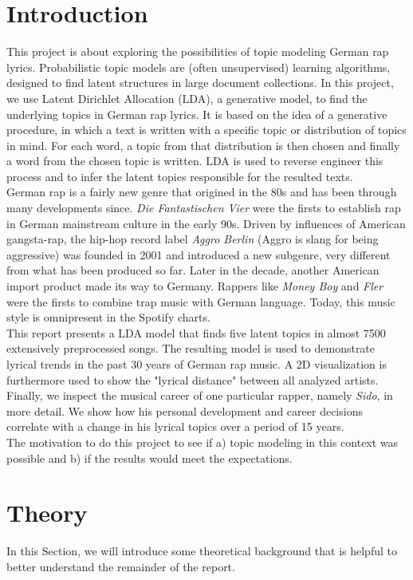 \documentclass[conference]{IEEEtran}
\begin{document}
\section{Introduction}
This project is about exploring the possibilities of topic modeling German rap lyrics. Probabilistic topic models are (often unsupervised) learning algorithms, designed to find latent structures in large document collections. In this project, we use Latent Dirichlet Allocation (LDA), a generative model, to find the underlying topics in German rap lyrics. It is based on the idea of a generative procedure, in which a text is written with a specific topic or distribution of topics in mind. For each word, a topic from that distribution is then chosen and finally a word from the chosen topic is written. LDA is used to reverse engineer this process and to infer the latent topics responsible for the resulted texts.\\
German rap is a fairly new genre that origined in the 80s and has been through many developments since. \textit{Die Fantastischen Vier} were the firsts to establish rap in German mainstream culture in the early 90s. Driven by influences of American gangsta-rap, the hip-hop record label \textit{Aggro Berlin} (Aggro is slang for being aggressive) was founded in 2001 and introduced a new subgenre, very different from what has been produced so far. Later in the decade, another American import product made its way to Germany. Rappers like \textit{Money Boy} and \textit{Fler} were the firsts to combine trap music with German language. Today, this music style is omnipresent in the Spotify charts.\\
This report presents a LDA model that finds five latent topics in almost 7500 extensively preprocessed songs. The resulting model is used to demonstrate lyrical trends in the past 30 years of German rap music. A 2D visualization is furthermore used to show the "lyrical distance" between all analyzed artists. Finally, we inspect the musical career of one particular rapper, namely \textit{Sido}, in more detail. We show how his personal development and career decisions correlate with a change in his lyrical topics over a period of 15 years.\\
The motivation to do this project to see if a) topic modeling in this context was possible and b) if the results would meet the expectations.

\section{Theory}
In this Section, we will introduce some theoretical background that is helpful to better understand the remainder of the report.
\end{document}
